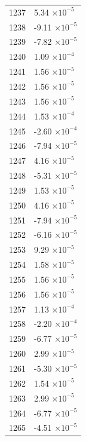 \documentclass[a4paper,11pt]{article}
\begin{document}
\begin{center}
\begin{longtable}{|R{1.5cm}|R{2.5cm}|}
 1237 &         5.34 $\times 10^{          -5}$ \\
 1238 &        -9.11 $\times 10^{          -5}$ \\
 1239 &        -7.82 $\times 10^{          -5}$ \\
 1240 &         1.09 $\times 10^{          -4}$ \\
 1241 &         1.56 $\times 10^{          -5}$ \\
 1242 &         1.56 $\times 10^{          -5}$ \\
 1243 &         1.56 $\times 10^{          -5}$ \\
 1244 &         1.53 $\times 10^{          -4}$ \\
 1245 &        -2.60 $\times 10^{          -4}$ \\
 1246 &        -7.94 $\times 10^{          -5}$ \\
 1247 &         4.16 $\times 10^{          -5}$ \\
 1248 &        -5.31 $\times 10^{          -5}$ \\
 1249 &         1.53 $\times 10^{          -5}$ \\
 1250 &         4.16 $\times 10^{          -5}$ \\
 1251 &        -7.94 $\times 10^{          -5}$ \\
 1252 &        -6.16 $\times 10^{          -5}$ \\
 1253 &         9.29 $\times 10^{          -5}$ \\
 1254 &         1.58 $\times 10^{          -5}$ \\
 1255 &         1.56 $\times 10^{          -5}$ \\
 1256 &         1.56 $\times 10^{          -5}$ \\
 1257 &         1.13 $\times 10^{          -4}$ \\
 1258 &        -2.20 $\times 10^{          -4}$ \\
 1259 &        -6.77 $\times 10^{          -5}$ \\
 1260 &         2.99 $\times 10^{          -5}$ \\
 1261 &        -5.30 $\times 10^{          -5}$ \\
 1262 &         1.54 $\times 10^{          -5}$ \\
 1263 &         2.99 $\times 10^{          -5}$ \\
 1264 &        -6.77 $\times 10^{          -5}$ \\
 1265 &        -4.51 $\times 10^{          -5}$ \\

\end{longtable}
\end{center}
\end{document}
